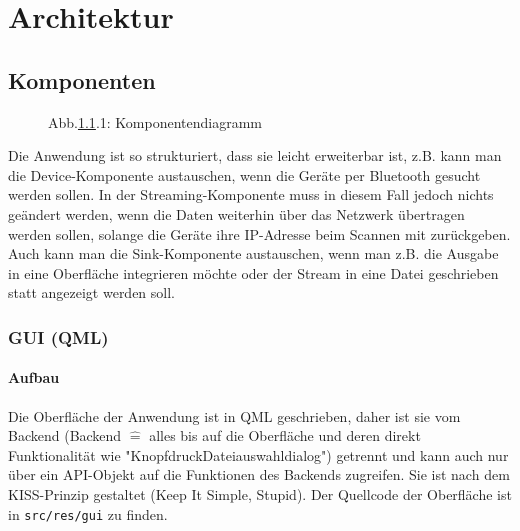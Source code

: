 \documentclass{article}
\begin{document}
    \section{Architektur}\label{sec:architektur}

    \subsection{Komponenten}\label{subsec:komponenten}

    \begin{figure}[!h]
        \centering
        {
        \svgfont
        \resizebox{\textwidth}{!}{}
        }
        \caption*{Abb.\ref{subsec:komponenten}.1: Komponentendiagramm}
    \end{figure}

    Die Anwendung ist so strukturiert, dass sie leicht erweiterbar ist, z.B.
    kann man die Device-Komponente austauschen, wenn die Geräte per Bluetooth gesucht werden sollen.
    In der Streaming-Komponente muss in diesem Fall jedoch nichts geändert werden, wenn die
    Daten weiterhin über das Netzwerk übertragen werden sollen, solange die Geräte ihre IP-Adresse beim Scannen mit zurückgeben.
    Auch kann man die Sink-Komponente austauschen, wenn man z.B. die Ausgabe in eine Oberfläche integrieren möchte oder
    der Stream in eine Datei geschrieben statt angezeigt werden soll.

    \newpage

    \subsubsection{GUI (QML)}\label{subsubsec:gui-(qml)}

    \paragraph{Aufbau}
    Die Oberfläche der Anwendung ist in QML geschrieben, daher ist sie vom Backend
    (Backend $\hat=$ alles bis auf die Oberfläche und deren direkt Funktionalität wie "Knopfdruck\textrightarrow Dateiauswahldialog")
    getrennt und kann auch nur über ein API-Objekt auf die Funktionen des Backends zugreifen.
    Sie ist nach dem KISS-Prinzip gestaltet (Keep It Simple, Stupid).
    Der Quellcode der Oberfläche ist in \texttt{src/res/gui} zu finden.
\end{document}
